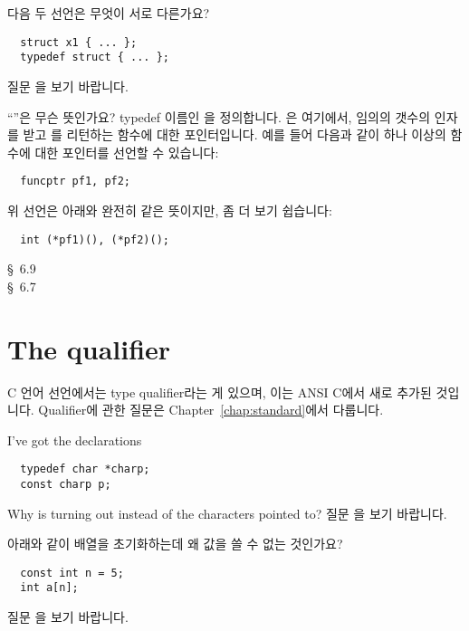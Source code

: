 \begin{faq}
        다음 두 선언은 무엇이 서로 다른가요?
\begin{verbatim}
  struct x1 { ... };
  typedef struct { ... };
\end{verbatim}
\A
        질문 을 보기 바랍니다.
\end{faq}

\begin{faq}
        ``''은 무슨 뜻인가요?
\A
        typedef 이름인 을 정의합니다. 은
        여기에서, 임의의 갯수의 인자를 받고 를 리턴하는 
        함수에 대한 포인터입니다. 예를 들어 다음과 같이 하나 이상의 함수에
        대한 포인터를 선언할 수 있습니다:
\begin{verbatim}
  funcptr pf1, pf2;
\end{verbatim}
        위 선언은 아래와 완전히 같은 뜻이지만, 좀 더 보기 쉽습니다:
\begin{verbatim}
  int (*pf1)(), (*pf2)();
\end{verbatim}
\R
        \cite{kr1} \S\ 6.9  \\
        \cite{kr2} \S\ 6.7 
\end{faq}


\section{The  qualifier}	\label{sec:const}
C 언어 선언에서는 type qualifier라는 게 있으며, 이는 ANSI C에서
새로 추가된 것입니다.  Qualifier에 관한 질문은 Chapter~\ref{chap:standard}에서
다룹니다.

\begin{faq}
        I've got the declarations
\begin{verbatim}
  typedef char *charp;
  const charp p;
\end{verbatim}
        Why is  turning out  instead of the characters
        pointed to?
\A
        질문 을 보기 바랍니다.
\end{faq}

\begin{faq}
        아래와 같이 배열을 초기화하는데 왜  값을 쓸 수 없는 것인가요?
\begin{verbatim}
  const int n = 5;
  int a[n];
\end{verbatim}
\A
        질문 을 보기 바랍니다.
\end{faq}

